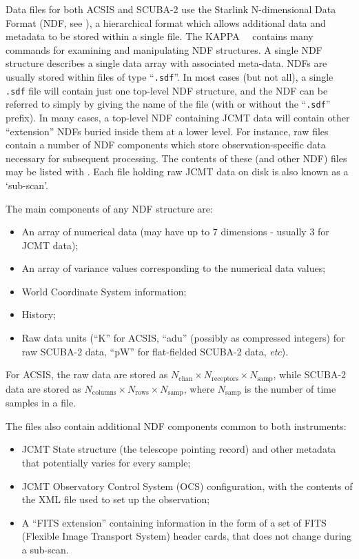 \documentclass[oneside,11pt]{starlink}
\begin{document}
Data files for both ACSIS and SCUBA-2 \cite{sc2ic01} use the Starlink N-dimensional
Data Format (NDF, see \ndfref), a hierarchical format which allows
additional data and metadata to be stored within a single file. The KAPPA
\KAPPA\ \ contains many commands for
examining and manipulating NDF structures. A single
NDF structure describes a single data array with associated meta-data.
NDFs are usually stored within files of type ``\verb+.sdf+''. In most
cases (but not all), a single \verb+.sdf+ file will contain just one
top-level NDF structure, and the NDF can be referred to simply by
giving the name of the file (with or without the ``\verb+.sdf+'' prefix).
In many cases, a top-level NDF containing JCMT data will contain other
``extension'' NDFs buried inside them at a lower level. For instance, raw
files contain a number of NDF components which store
observation-specific data necessary for subsequent processing. The
contents of these (and other NDF) files may be listed with
\HDSTRACEref. Each file holding raw JCMT data on disk is also known as a
`sub-scan'.

The main components of any NDF structure are:
\begin{itemize}
\item An array of numerical data (may have up to 7 dimensions - usually 3
for JCMT data);
\item An array of variance values corresponding to the numerical data
values;
\item World Coordinate System information;
\item History;
\item Raw data units (``K'' for ACSIS, ``adu'' (possibly as compressed integers)
for raw SCUBA-2 data,  ``pW'' for flat-fielded SCUBA-2 data, \emph{etc}).
\end{itemize}
For ACSIS, the raw data are stored as $N_{\textrm{chan}} \times N_{\textrm{receptors}} \times N_{\textrm{samp}}$, while SCUBA-2 data are stored as
$N_{\textrm{columns}} \times N_{\textrm{rows}} \times N_{\textrm{samp}}$, where
$N_{\textrm{samp}}$ is the number of time samples in a file.

The files also contain additional NDF components common to both
instruments:
\begin{itemize}
\item JCMT State structure (the telescope pointing record) and other
  metadata that potentially varies for every sample;
\item JCMT Observatory Control System (OCS) configuration, with the
  contents of the XML file used to set up the observation;
\item A ``FITS extension'' containing information in the form of a set of
  FITS (Flexible Image Transport System) header cards, that does not
  change during a sub-scan.
\end{itemize}
\end{document}
